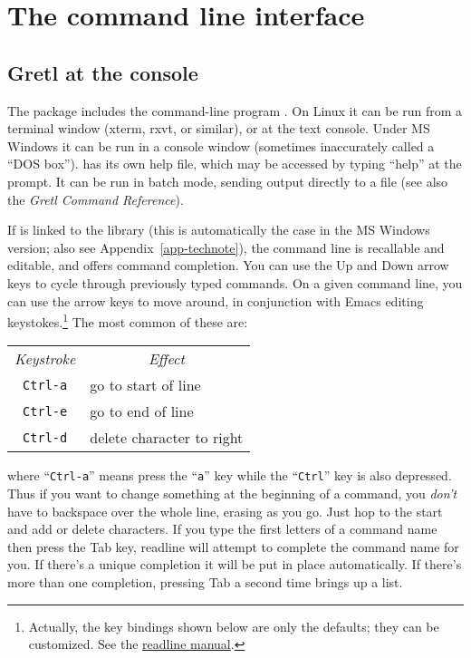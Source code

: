 \chapter{The command line interface}
\label{cli}

\section{Gretl at the console}
\label{cli-console}

The  package includes the command-line program
.  On Linux it can be run from a terminal window (xterm,
rxvt, or similar), or at the text console.  Under MS Windows it can be
run in a console window (sometimes inaccurately called a ``DOS box'').
 has its own help file, which may be accessed by typing
``help'' at the prompt. It can be run in batch mode, sending output
directly to a file (see also the \emph{Gretl Command Reference}).
    
If  is linked to the  library (this is
automatically the case in the MS Windows version; also see
Appendix~\ref{app-technote}), the command line is recallable and
editable, and offers command completion.  You can use the Up and Down
arrow keys to cycle through previously typed commands.  On a given
command line, you can use the arrow keys to move around, in
conjunction with Emacs editing keystokes.\footnote{Actually, the key
  bindings shown below are only the defaults; they can be customized.
  See the
  \href{http://cnswww.cns.cwru.edu/~chet/readline/readline.html}{readline
    manual}.} The most common of these are:
%    
\begin{center}
  \begin{tabular}{cl}
    \textit{Keystroke} & \multicolumn{1}{c}{\textit{Effect}}\\
    \verb+Ctrl-a+ & go to start of line\\
    \verb+Ctrl-e+ & go to end of line\\
    \verb+Ctrl-d+ & delete character to right\\
  \end{tabular}
\end{center}
%
where ``\verb+Ctrl-a+'' means press the ``\verb+a+'' key while the
``\verb+Ctrl+'' key is also depressed.  Thus if you want to change
something at the beginning of a command, you \emph{don't} have to
backspace over the whole line, erasing as you go.  Just hop to the
start and add or delete characters.  If you type the first letters of
a command name then press the Tab key, readline will attempt to
complete the command name for you.  If there's a unique completion it
will be put in place automatically.  If there's more than one
completion, pressing Tab a second time brings up a list.

